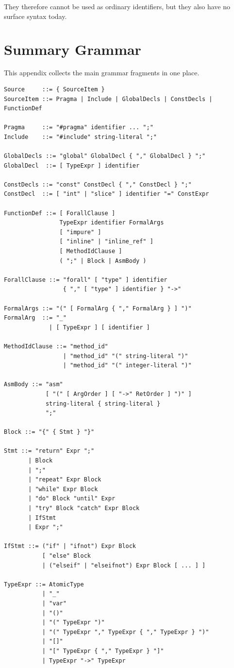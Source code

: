 \documentclass[12pt,oneside]{article}
\begin{document}
They therefore cannot be used as ordinary identifiers, but they also have no
surface syntax today.

\appendix
\section{Summary Grammar}
This appendix collects the main grammar fragments in one place.

\begin{verbatim}
Source     ::= { SourceItem }
SourceItem ::= Pragma | Include | GlobalDecls | ConstDecls | FunctionDef

Pragma     ::= "#pragma" identifier ... ";"
Include    ::= "#include" string-literal ";"

GlobalDecls ::= "global" GlobalDecl { "," GlobalDecl } ";"
GlobalDecl  ::= [ TypeExpr ] identifier

ConstDecls ::= "const" ConstDecl { "," ConstDecl } ";"
ConstDecl  ::= [ "int" | "slice" ] identifier "=" ConstExpr

FunctionDef ::= [ ForallClause ]
                TypeExpr identifier FormalArgs
                [ "impure" ]
                [ "inline" | "inline_ref" ]
                [ MethodIdClause ]
                ( ";" | Block | AsmBody )

ForallClause ::= "forall" [ "type" ] identifier
                 { "," [ "type" ] identifier } "->"

FormalArgs ::= "(" [ FormalArg { "," FormalArg } ] ")"
FormalArg  ::= "_"
             | [ TypeExpr ] [ identifier ]

MethodIdClause ::= "method_id"
                 | "method_id" "(" string-literal ")"
                 | "method_id" "(" integer-literal ")"

AsmBody ::= "asm"
            [ "(" [ ArgOrder ] [ "->" RetOrder ] ")" ]
            string-literal { string-literal }
            ";"

Block ::= "{" { Stmt } "}"

Stmt ::= "return" Expr ";"
       | Block
       | ";"
       | "repeat" Expr Block
       | "while" Expr Block
       | "do" Block "until" Expr
       | "try" Block "catch" Expr Block
       | IfStmt
       | Expr ";"

IfStmt ::= ("if" | "ifnot") Expr Block
           [ "else" Block
           | ("elseif" | "elseifnot") Expr Block [ ... ] ]

TypeExpr ::= AtomicType
           | "_"
           | "var"
           | "()"
           | "(" TypeExpr ")"
           | "(" TypeExpr "," TypeExpr { "," TypeExpr } ")"
           | "[]"
           | "[" TypeExpr { "," TypeExpr } "]"
           | TypeExpr "->" TypeExpr
\end{verbatim}
\end{document}
